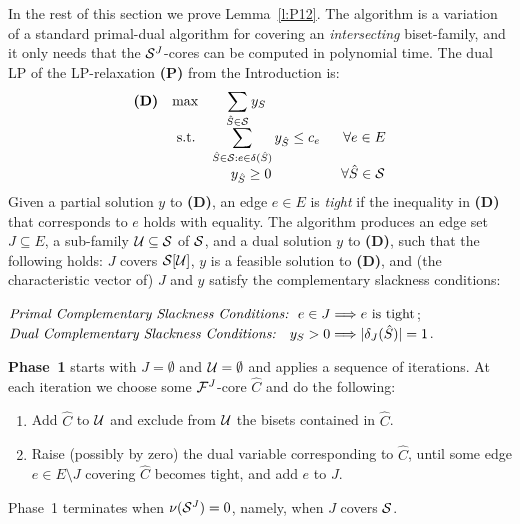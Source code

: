 In the rest of this section we prove Lemma~\ref{l:P12}.
The algorithm is a variation of a standard primal-dual algorithm
for covering an {\em intersecting} biset-family, and it only needs that the 
${\cal S}^J$-cores can be computed in polynomial time. 
The dual LP of the LP-relaxation {\bf (P)} from the Introduction is:
\[ \displaystyle
\begin{array} {llll} \mbox{\bf (D)}
& \max          & \ \ \ \displaystyle \sum_{\hat{S} \in {\cal S}} y_S  \\
& \ \mbox{s.t.} & \displaystyle \sum_{\hat{S} \in {\cal S}: e \in \delta(\hat{S})} y_{\hat{S}} \leq c_e 
                  \ \ \ \ \ \forall e \in E \\
&               & \ \ \ \ y_{\hat{S}} \geq 0 \ \ \ \ \ \ \ \ \ \ \ \ \ \ \ \forall \hat{S} \in {\cal S}
\end{array}
\]
Given a partial solution $y$ to {\bf (D)}, an edge $e \in E$ is {\em tight}
if the inequality in {\bf (D)} that corresponds to $e$ holds with equality.
The algorithm produces an edge set $J \subseteq E$, a sub-family ${\cal U} \subseteq {\cal S}$ of ${\cal S}$,
and a dual solution $y$ to {\bf (D)}, such that the following holds: 
$J$ covers ${\cal S}[{\cal U}]$, $y$ is a feasible solution to {\bf (D)},
and (the characteristic vector of) $J$ and $y$ satisfy the complementary slackness conditions: 

\noindent
$\displaystyle \mbox{\em Primal Complementary Slackness Conditions:} \ \   e \in J \Longrightarrow \mbox{$e$ is tight}$; \\
$\displaystyle \mbox{\em Dual Complementary Slackness Conditions:} \ \ \  y_S>0 \Longrightarrow |\delta_J(\hat{S})|=1$.

{\bf Phase~1} starts with $J=\emptyset$ and ${\cal U}=\emptyset$ and applies a sequence of iterations.
At each iteration we choose some ${\cal F}^J$-core $\hat{C}$ and do the following:
\begin{enumerate}
\item
Add $\hat{C}$ to ${\cal U}$ and exclude from ${\cal U}$ the bisets contained in $\hat{C}$.
\item
Raise (possibly by zero) the dual variable corresponding to $\hat{C}$, 
until some edge $e \in E \setminus J$ covering $\hat{C}$ becomes tight, and add $e$ to $J$.
\end{enumerate}

Phase~1 terminates when $\nu({\cal S}^J)=0$, namely, when $J$ covers ${\cal S}$. 

\vspace{0.2cm}

